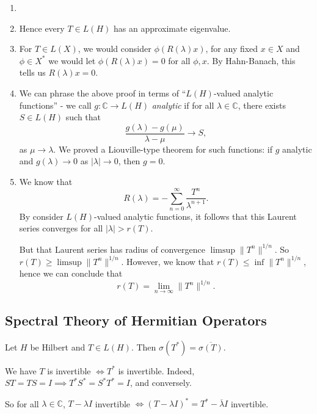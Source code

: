 \documentclass[12pt]{article}
\begin{document}
\begin{remark}
	\begin{enumerate}
		\item[]
		\item Hence every $T \in L(H)$ has an approximate eigenvalue.
		\item For $T \in L(X)$, we would consider $\phi(R(\lambda) x)$, for any fixed $x \in X$ and $\phi \in X^{\ast}$ we would let $\phi(R(\lambda) x) = 0$ for all $\phi, x$. By Hahn-Banach, this tells us $R(\lambda)x = 0$.
		\item We can phrase the above proof in terms of ``$L(H)$-valued analytic functions'' - we call $g : \mathbb{C} \to L(H)$ \emph{analytic} if for all $\lambda \in \mathbb{C}$, there exists $S \in L(H)$ such that
			\[
			\frac{g(\lambda) - g(\mu)}{\lambda - \mu} \to S,
			\]
			as $\mu \to \lambda$. We proved a Liouville-type theorem for such functions: if $g$ analytic and $g(\lambda) \to 0$ as $|\lambda| \to 0$, then $g = 0$.
		\item We know that
			\[
			R(\lambda) = -\sum_{n = 0}^{\infty}\frac{T^{n}}{\lambda^{n+1}}.
			\]
			By consider $L(H)$-valued analytic functions, it follows that this Laurent series converges for all $|\lambda| > r(T)$.

			But that Laurent series has radius of convergence $\limsup \|T^{n}\|^{1/n}$. So $r(T) \ge \limsup \|T^{n}\|^{1/n}$. However, we know that $r(T) \leq \inf \|T^{n}\|^{1/n}$, hence we can conclude that
			\[
			r(T) = \lim_{n \to \infty} \|T^{n}\|^{1/n}.
			\]
	\end{enumerate}
\end{remark}

\subsection{Spectral Theory of Hermitian Operators}
\label{sub:spec_herm}

\begin{proposition}
	Let $H$ be Hilbert and $T \in L(H)$. Then $\sigma(T^{\ast}) = \overline{\sigma(T)}$.
\end{proposition}

\begin{proofbox}
	We have $T$ is invertible $\iff T^{\ast}$ is invertible. Indeed, $ST = TS = I \implies T^{\ast} S^{\ast} = S^{\ast} T^{\ast} = I$, and conversely.

	So for all $\lambda \in \mathbb{C}$, $T - \lambda I$ invertible $\iff (T - \lambda I)^{\ast} = T^{\ast} - \overline{\lambda} I$ invertible.
\end{proofbox}
\end{document}
